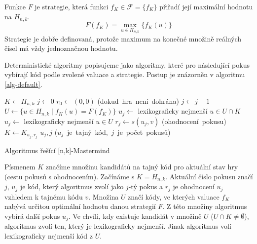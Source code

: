 \begin{prikl}\label{prstrategie}
    Funkce $F$ je strategie, která funkci $f_K \in \mathcal{F} = \{f_K\}$ přiřadí její maximální hodnotu na $H_{n,k}$.
    \[F(f_K) =  \max_{u\in H_{n,k}}\{f_K(u)\}\]
    Strategie je dobře definovaná, protože maximum na konečné množině reálných čísel má vždy jednoznačnou hodnotu.
\end{prikl}

Deterministické algoritmy popisujeme jako algoritmy, které pro následující pokus vybírají kód podle zvolené valuace a strategie. Postup je znázorněn v algoritmu \ref{alg-default}.








\begin{algorithm}[h!]
\begin{algorithmic}[1]  %
    \State $K \gets H_{n,k}$ 
    \State $j \gets 0$
    \State $r_0 \gets (0,0)$
     \hfill \mbox{(dokud hra není dohrána)}
        \State $j \gets j + 1$ 
	\State $U \gets \{u \in H_{n,k} \mid f_K(u) = F(f_K)\}$
            \State $u_j \gets$ lexikograficky nejmenší $u \in U \cap K$
	\Else
		\State $u_j \gets$ lexikograficky nejmenší $u \in U$
	\EndIf
        \State $r_j \gets s(u_j, v)$ \hfill \mbox{(ohodnocení pokusu)}
        \State $K \gets K_{u_j,r_j}$
    \EndWhile
    \State \Return $u_j, j$ \hfill \mbox{($u_j$ je tajný kód, $j$ je počet pokusů)}
\EndFunction
\end{algorithmic}
\caption{Algoritmus řešící [n,k]-Mastermind}
\label{alg-default}
\end{algorithm}

Písmenem $K$ značíme množinu kandidátů na tajný kód pro aktuální stav hry (cestu pokusů s ohodnocením). Začínáme s $K = H_{n,k}$. Aktuální číslo pokusu značí $j$, $u_j$ je kód, který algoritmus zvolí jako $j$-tý pokus a $r_j$ je ohodnocení $u_j$ vzhledem k tajnému kódu $v$. Množina $U$ značí kódy, ve kterých valuace $f_K$ nabývá určitou optimální hodnotu danou strategií $F$. Z této množiny algoritmus vybírá další pokus $u_j$. Ve chvíli, kdy existuje kandidát v množině $U$ ($U\cap K \neq \emptyset$), algoritmus zvolí ten, který je lexikograficky nejmenší. Jinak algoritmus volí lexikograficky nejmenší kód z $U$. 

